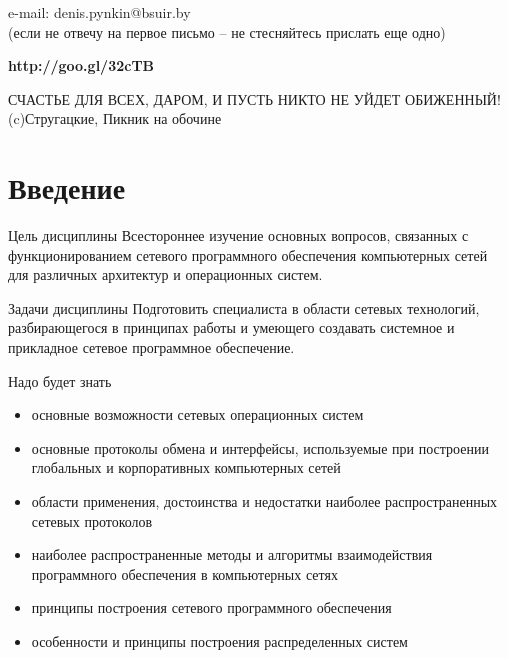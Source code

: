 
\subtitle{Введение}

%
%

\begin{frame}
\titlepage
\begin{center}
e-mail: denis.pynkin@bsuir.by\\
{\tiny(если не отвечу на первое письмо -- не стесняйтесь прислать еще одно)}
\end{center}
\begin{center}
{\bfseries http://goo.gl/32cTB}

{\tiny СЧАСТЬЕ ДЛЯ ВСЕХ, ДАРОМ, И ПУСТЬ НИКТО НЕ УЙДЕТ ОБИЖЕННЫЙ!\\
(c)Стругацкие, Пикник на обочине}
\end{center}
\end{frame}

\section{Введение}

\begin{frame}{Цель дисциплины}
	Всестороннее изучение основных вопросов, связанных с функционированием сетевого программного обеспечения компьютерных сетей для различных архитектур и операционных систем.
\end{frame}

\begin{frame}{Задачи дисциплины}
	Подготовить специалиста в области сетевых технологий,  разбирающегося в принципах работы и умеющего создавать системное и прикладное сетевое программное обеспечение.
\end{frame}

\begin{frame}{Надо будет знать}
	\begin{itemize}
		\item основные возможности сетевых операционных систем
		\item основные протоколы обмена и интерфейсы, используемые при построении глобальных и корпоративных компьютерных сетей
		\item области применения,  достоинства и недостатки наиболее распространенных сетевых протоколов
		\item наиболее распространенные методы и алгоритмы взаимодействия программного обеспечения в компьютерных сетях
		\item принципы построения сетевого программного обеспечения
		\item особенности и принципы построения распределенных систем
	\end{itemize}
\end{frame}

